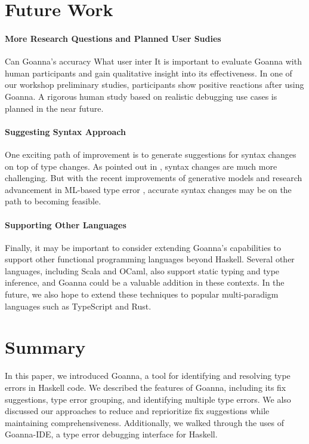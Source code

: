 \documentclass[pdflatex,sn-mathphys-num]{sn-jnl}%
\begin{document}
\section{Future Work}\label{sec:future-work}

\paragraph{\textbf{More Research Questions and Planned User Sudies}}

Can Goanna's accuracy
What user inter
It is important to evaluate Goanna with human participants and gain qualitative insight into its effectiveness. In one of our workshop preliminary studies, participants show positive reactions after using Goanna. A rigorous human study based on realistic debugging use cases is planned in the near future.   
  	
\paragraph{\textbf{Suggesting Syntax Approach}}

One exciting path of improvement is to generate suggestions for syntax changes on top of type changes. As pointed out in \cite{Chen2014-dz}, syntax changes are much more challenging. But with the recent improvements of generative models and research advancement in ML-based type error \cite{Seidel2017-uf}, accurate syntax changes may be on the path to becoming feasible.

\paragraph{\textbf{Supporting Other Languages}}

Finally, it may be important to consider extending Goanna's capabilities to support other functional programming languages beyond Haskell. Several other languages, including Scala and OCaml, also support static typing and type inference, and Goanna could be a valuable addition in these contexts. In the future, we also hope to extend these techniques to popular multi-paradigm languages such as TypeScript and Rust.

  	
\section{Summary} \label{sec:conclusion}

In this paper, we introduced Goanna, a tool for identifying and resolving type errors in Haskell code. We described the features of Goanna, including its fix suggestions, type error grouping, and identifying multiple type errors. We also discussed our approaches to reduce and reprioritize fix suggestions while maintaining comprehensiveness. Additionally, we walked through the uses of Goanna-IDE, a type error debugging interface for Haskell.
\end{document}
